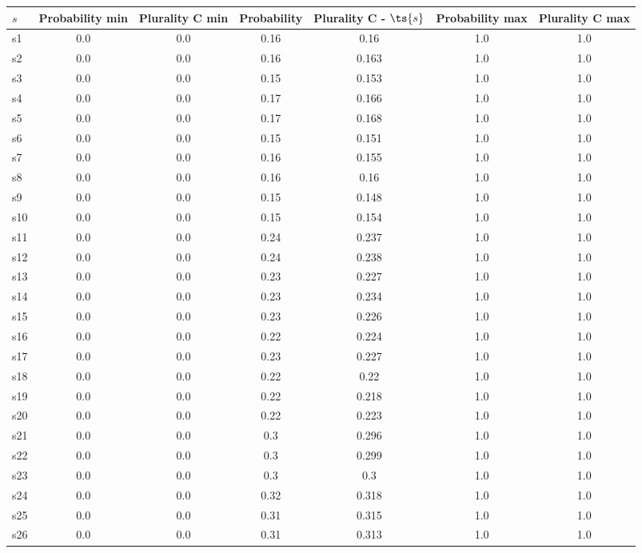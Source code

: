 \documentclass{article}
\begin{document}
\noindent\begin{tabular}{|l|c|c|c|c|c|c|}
\hline
$s$& Probability min & Plurality C min & Probability & Plurality C - $\ts{s}$ & Probability max & Plurality C max\\
\hline
s1 &0.0 & 0.0 & 0.16 & 0.16 & 1.0 & 1.0\\
\hline
s2 &0.0 & 0.0 & 0.16 & 0.163 & 1.0 & 1.0\\
\hline
s3 &0.0 & 0.0 & 0.15 & 0.153 & 1.0 & 1.0\\
\hline
s4 &0.0 & 0.0 & 0.17 & 0.166 & 1.0 & 1.0\\
\hline
s5 &0.0 & 0.0 & 0.17 & 0.168 & 1.0 & 1.0\\
\hline
s6 &0.0 & 0.0 & 0.15 & 0.151 & 1.0 & 1.0\\
\hline
s7 &0.0 & 0.0 & 0.16 & 0.155 & 1.0 & 1.0\\
\hline
s8 &0.0 & 0.0 & 0.16 & 0.16 & 1.0 & 1.0\\
\hline
s9 &0.0 & 0.0 & 0.15 & 0.148 & 1.0 & 1.0\\
\hline
s10 &0.0 & 0.0 & 0.15 & 0.154 & 1.0 & 1.0\\
\hline
s11 &0.0 & 0.0 & 0.24 & 0.237 & 1.0 & 1.0\\
\hline
s12 &0.0 & 0.0 & 0.24 & 0.238 & 1.0 & 1.0\\
\hline
s13 &0.0 & 0.0 & 0.23 & 0.227 & 1.0 & 1.0\\
\hline
s14 &0.0 & 0.0 & 0.23 & 0.234 & 1.0 & 1.0\\
\hline
s15 &0.0 & 0.0 & 0.23 & 0.226 & 1.0 & 1.0\\
\hline
s16 &0.0 & 0.0 & 0.22 & 0.224 & 1.0 & 1.0\\
\hline
s17 &0.0 & 0.0 & 0.23 & 0.227 & 1.0 & 1.0\\
\hline
s18 &0.0 & 0.0 & 0.22 & 0.22 & 1.0 & 1.0\\
\hline
s19 &0.0 & 0.0 & 0.22 & 0.218 & 1.0 & 1.0\\
\hline
s20 &0.0 & 0.0 & 0.22 & 0.223 & 1.0 & 1.0\\
\hline
s21 &0.0 & 0.0 & 0.3 & 0.296 & 1.0 & 1.0\\
\hline
s22 &0.0 & 0.0 & 0.3 & 0.299 & 1.0 & 1.0\\
\hline
s23 &0.0 & 0.0 & 0.3 & 0.3 & 1.0 & 1.0\\
\hline
s24 &0.0 & 0.0 & 0.32 & 0.318 & 1.0 & 1.0\\
\hline
s25 &0.0 & 0.0 & 0.31 & 0.315 & 1.0 & 1.0\\
\hline
s26 &0.0 & 0.0 & 0.31 & 0.313 & 1.0 & 1.0\\
\hline

\end{tabular}
\end{document}
